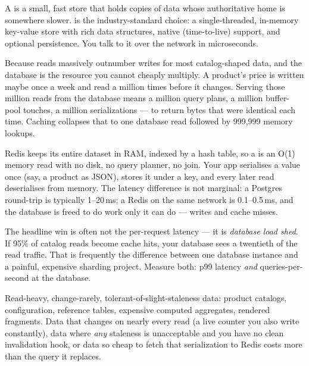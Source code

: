

 A  is a small, fast store that holds copies of data whose authoritative home is somewhere slower.  is the industry-standard choice: a single-threaded, in-memory key-value store with rich data structures, native  (time-to-live) support, and optional persistence. You talk to it over the network in microseconds.

 Because reads massively outnumber writes for most catalog-shaped data, and the database is the resource you cannot cheaply multiply. A product's price is written maybe once a week and read a million times before it changes. Serving those million reads from the database means a million query plans, a million buffer-pool touches, a million serializations --- to return bytes that were identical each time. Caching collapses that to one database read followed by 999{,}999 memory lookups.

 Redis keeps its entire dataset in RAM, indexed by a hash table, so a  is an O(1) memory read with no disk, no query planner, no join. Your app serialises a value once (say, a product as JSON), stores it under a key, and every later read deserialises from memory. The latency difference is not marginal: a Postgres round-trip is typically 1--20\,ms; a Redis  on the same network is 0.1--0.5\,ms, and the database is freed to do work only it can do --- writes and cache misses.

\begin{perfnote}
The headline win is often not the per-request latency --- it is \emph{database load shed}. If 95\% of catalog reads become cache hits, your database sees a twentieth of the read traffic. That is frequently the difference between one database instance and a painful, expensive sharding project. Measure both: p99 latency \emph{and} queries-per-second at the database.
\end{perfnote}

 Read-heavy, change-rarely, tolerant-of-slight-staleness data: product catalogs, configuration, reference tables, expensive computed aggregates, rendered fragments.  Data that changes on nearly every read (a live counter you also write constantly), data where \emph{any} staleness is unacceptable and you have no clean invalidation hook, or data so cheap to fetch that serialization to Redis costs more than the query it replaces.

